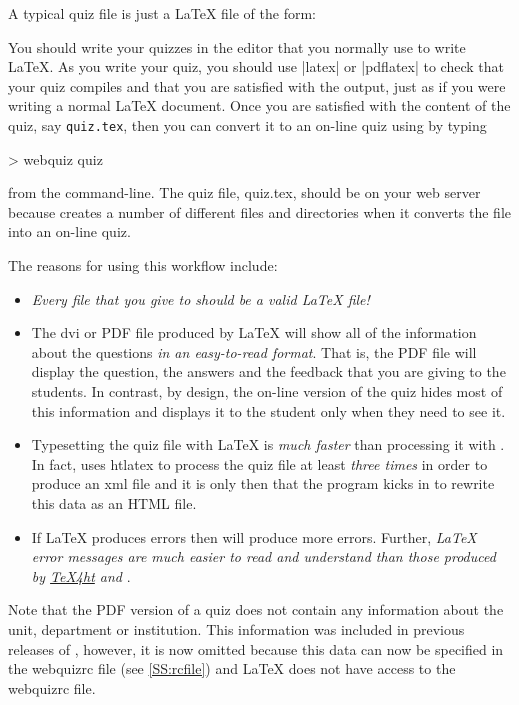 \documentclass[svgnames]{article}
\newcommand\TeXfht{\href{https://www.ctan.org/tex4ht}{TeX4ht}\xspace}
\newcommand\webquizrc{\index{webquizrc}\textsf{webquizrc}\xspace}
\begin{document}
  A typical \WebQuiz quiz file is just a \LaTeX{} file of the form:


  \noindent You should write your quizzes in the editor that you
  normally use to write \LaTeX. As you write your quiz, you should use
  \BashCode|latex| or \BashCode|pdflatex| to check that your quiz
  compiles and that you are satisfied with the output, just as if you
  were writing a normal \LaTeX{} document.  Once you are satisfied with
  the content of the quiz, say \texttt{quiz.tex}, then you can convert
  it to an on-line quiz using \WebQuiz by typing
  \begin{bashcode}
     > webquiz quiz
  \end{bashcode}
  from the command-line. The quiz file, \textsf{quiz.tex}, should be on
  your web server because \WebQuiz creates a number of different
  files and directories when it converts the file into an on-line quiz.

  The reasons for using this workflow include:
  \begin{itemize}
    \item
    \textit{Every file that you give to \WebQuiz should be a valid \LaTeX{} file!}

    \item The \textsf{dvi} or \textsf{PDF} file produced by \LaTeX{}
    will show all of the information about the questions
    \textit{in an easy-to-read format}. That is, the PDF file will
    display the question, the answers and the feedback that you are
    giving to the students. In contrast, by design, the on-line version
    of the quiz hides most of this information and displays it to the
    student only when they need to see it.

    \item Typesetting the quiz file with \LaTeX{} is \textit{much
    faster} than processing it with \WebQuiz. In fact, \WebQuiz uses
    \textsf{htlatex} to process the quiz file at least \textit{three times} in
    order to produce an \textsf{xml} file and it is only then that the
    \WebQuiz program kicks in to rewrite this data as an \textsf{HTML}
    file.

    \item If \LaTeX{} produces errors then \WebQuiz will produce more
    errors. Further, \textit{\LaTeX{} error messages are much easier to read and
    understand than those produced by \TeXfht and \WebQuiz}.
  \end{itemize}
  Note that the PDF version of a quiz does not contain any
  information about the unit, department or institution. This
  information was included in previous releases of \WebQuiz, however, it
  is now omitted because this data can now be specified in the \webquizrc
  file (see \autoref{SS:rcfile}) and \LaTeX{} does not have access to
  the \webquizrc file.
\end{document}
